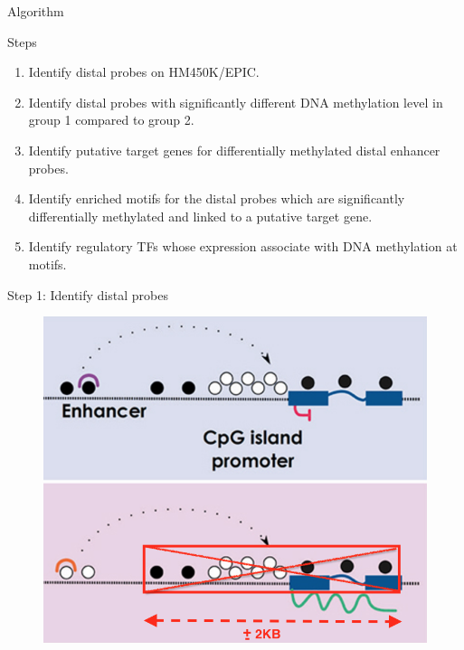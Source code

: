 \documentclass[slidestop,compress,11pt,xcolor=dvipsnames]{beamer}
\begin{document}
\begin{frame}{Algorithm}

\begin{exampleblock}{Steps}
\begin{enumerate}
\item  Identify distal probes on HM450K/EPIC.
\item  Identify distal probes with significantly different DNA methylation level in  group 1 compared to group 2.
\item  Identify putative target genes for differentially methylated distal enhancer probes.
\item  Identify enriched motifs for the distal  probes which are significantly differentially methylated and linked to a putative target gene.
\item  Identify regulatory TFs whose expression associate with DNA methylation at motifs.
\end{enumerate}

\end{exampleblock}
\end{frame}


\begin{frame}{Step 1: Identify distal probes}
 \begin{figure}
  \centering
  \includegraphics[width=0.7\linewidth]{step1.png}
 \end{figure}
\end{frame}
\end{document}
